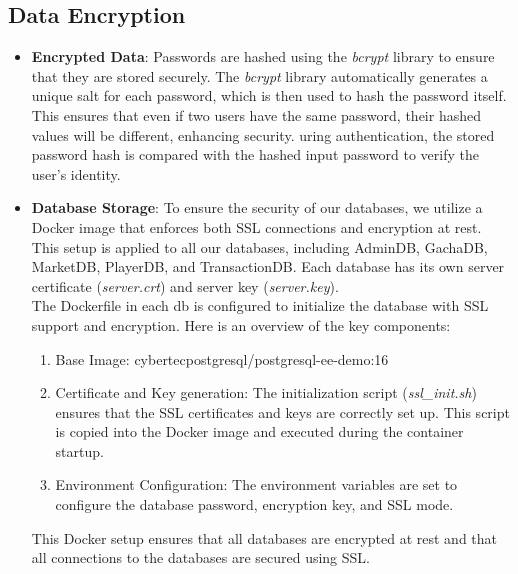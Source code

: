 \documentclass{article}
\begin{document}
\newpage

\subsection{Data Encryption}
\begin{itemize}
    \item \textbf{Encrypted Data}: Passwords are hashed using the \emph{bcrypt} library to ensure that they are stored securely. The \emph{bcrypt} library automatically generates a unique salt for each password, which is then used to hash the password itself. This ensures that even if two users have the same password, their hashed values will be different, enhancing security. uring authentication, the stored password hash is compared with the hashed input password to verify the user's identity.
    \item \textbf{Database Storage}: To ensure the security of our databases, we utilize a Docker image that enforces both SSL connections and encryption at rest. This setup is applied to all our databases, including AdminDB, GachaDB, MarketDB, PlayerDB, and TransactionDB. Each database has its own server certificate (\emph{server.crt}) and server key (\emph{server.key}). \\
    The Dockerfile in each db is configured to initialize the database with SSL support and encryption. Here is an overview of the key components:
    \begin{enumerate}
        \item Base Image: cybertecpostgresql/postgresql-ee-demo:16
        \item Certificate and Key generation: The initialization script (\emph{ssl\_init.sh}) ensures that the SSL certificates and keys are correctly set up. This script is copied into the Docker image and executed during the container startup.
        \item Environment Configuration: The environment variables are set to configure the database password, encryption key, and SSL mode.
    \end{enumerate}
    This Docker setup ensures that all databases are encrypted at rest and that all connections to the databases are secured using SSL.
\end{itemize}

\newpage
\end{document}

